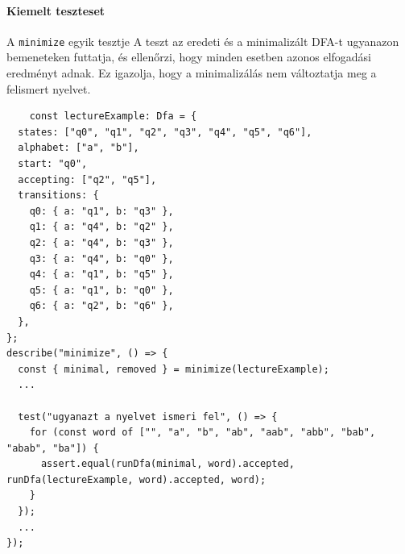 \newpage
\paragraph{Kiemelt teszteset} A \texttt{minimize} egyik tesztje A teszt az eredeti és a minimalizált DFA-t ugyanazon bemeneteken futtatja, és ellenőrzi, hogy minden esetben azonos elfogadási eredményt adnak. Ez igazolja, hogy a minimalizálás nem változtatja meg a felismert nyelvet.
\begin{lstlisting}
    const lectureExample: Dfa = {
  states: ["q0", "q1", "q2", "q3", "q4", "q5", "q6"],
  alphabet: ["a", "b"],
  start: "q0",
  accepting: ["q2", "q5"],
  transitions: {
    q0: { a: "q1", b: "q3" },
    q1: { a: "q4", b: "q2" },
    q2: { a: "q4", b: "q3" },
    q3: { a: "q4", b: "q0" },
    q4: { a: "q1", b: "q5" },
    q5: { a: "q1", b: "q0" },
    q6: { a: "q2", b: "q6" },
  },
};
describe("minimize", () => {
  const { minimal, removed } = minimize(lectureExample);
  ...

  test("ugyanazt a nyelvet ismeri fel", () => {
    for (const word of ["", "a", "b", "ab", "aab", "abb", "bab", "abab", "ba"]) {
      assert.equal(runDfa(minimal, word).accepted, runDfa(lectureExample, word).accepted, word);
    }
  });
  ...
});
\end{lstlisting}

\newpage

